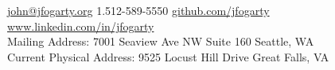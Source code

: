 \documentclass[10pt,a4paper]{article}
\begin{document}
\sloppy  %



\nobreakvspace{0.3em}  %

\noindent\href{mailto:john.at.jfogarty.dot.org}{john\mbox{}@\mbox{}jfogarty.org}\sbull
\textsmaller{+}1.512-589-5550\sbull
\href{https://github.com/jfogarty}{github.com/jfogarty}
\sbull
\href{http://www.linkedin.com/in/jfogarty}{www.linkedin.com/in/jfogarty}
\\
Mailing Address: 7001 Seaview Ave NW\sbull
Suite 160\sbull
Seattle, WA
\\
Current Physical Address:
9525 Locust Hill Drive\sbull
\hspace*{1mm}Great Falls, VA

\spacedhrule{0.9em}{-0.4em}  %

\end{document}
